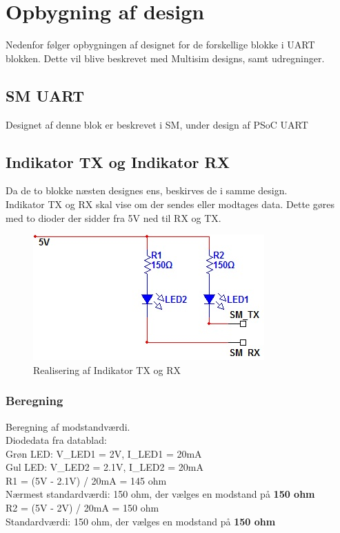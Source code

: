 \section{Opbygning af design}
Nedenfor følger opbygningen af designet for de forskellige blokke i UART blokken. Dette vil blive beskrevet med Multisim designs, samt udregninger. 
\subsection{SM UART}
Designet af denne blok er beskrevet i SM, under design af PSoC UART
\subsection{Indikator TX og Indikator RX}
Da de to blokke næsten designes ens, beskirves de i samme design. \\
Indikator TX og RX skal vise om der sendes eller modtages data. Dette gøres med to dioder der sidder fra 5V ned til RX og TX.
\begin{figure}[H]
\centering
\includegraphics[scale=1]{billeder/Indikator_RX_TX}
\caption{Realisering af Indikator TX og RX}
\label{fig:Indikator_RX_TX}
\end{figure}
\subsubsection{Beregning}
Beregning af modstandværdi.\\
Diodedata fra datablad:\\
Grøn LED: V\_LED1 = 2V, I\_LED1 = 20mA\\
Gul LED: V\_LED2 = 2.1V, I\_LED2 = 20mA\\
R1 = (5V - 2.1V) / 20mA = 145 ohm \\
Nærmest standardværdi: 150 ohm, der vælges en modstand på \textbf{150 ohm} \\
R2 = (5V - 2V) / 20mA = 150 ohm \\
Standardværdi: 150 ohm, der vælges en modstand på \textbf{150 ohm} \\
\newpage
